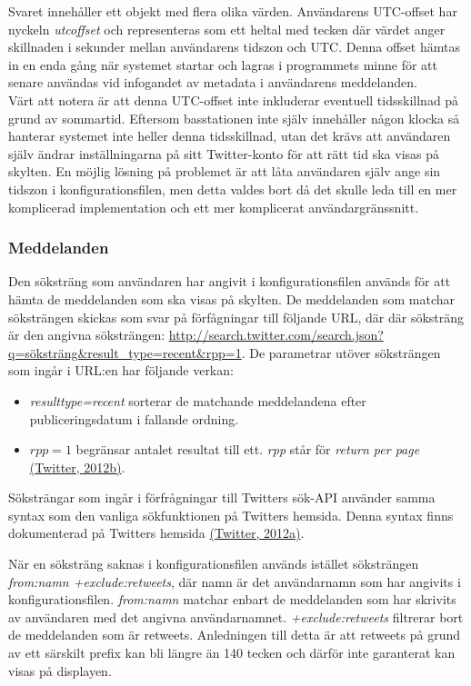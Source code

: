 \documentclass[a4paper,11pt]{article}
\begin{document}
Svaret innehåller ett objekt med flera olika värden. Användarens UTC-offset har nyckeln {\it utc\textunderscore offset} och representeras som ett heltal med tecken där värdet anger skillnaden i sekunder mellan användarens tidszon och UTC. Denna offset hämtas in en enda gång när systemet startar och lagras i programmets minne för att senare användas vid infogandet av metadata i användarens meddelanden.\\

Värt att notera är att denna UTC-offset inte inkluderar eventuell tidsskillnad på grund av sommartid. Eftersom basstationen inte själv innehåller någon klocka så hanterar systemet inte heller denna tidsskillnad, utan det krävs att användaren själv ändrar inställningarna på sitt Twitter-konto för att rätt tid ska visas på skylten. En möjlig lösning på problemet är att låta användaren själv ange sin tidszon i konfigurationsfilen, men detta valdes bort då det skulle leda till en mer komplicerad implementation och ett mer komplicerat användargränssnitt.

\subsubsection{Meddelanden}
Den söksträng som användaren har angivit i konfigurationsfilen används för att hämta de meddelanden som ska visas på skylten. De meddelanden som matchar söksträngen skickas som svar på förfågningar till följande URL, där där söksträng är den angivna söksträngen: \url{http://search.twitter.com/search.json?q=söksträng&result_type=recent&rpp=1}. De parametrar utöver söksträngen som ingår i URL:en har följande verkan:

	\begin{itemize}
    	\item {\it result\textunderscore type=recent} sorterar de matchande meddelandena efter publiceringsdatum i fallande ordning.
    	\item {\it $rpp=1$} begränsar antalet resultat till ett. {\it rpp} står för {\it return per page} \hyperref[twitter]{(Twitter, 2012b)}.
	\end{itemize}

Söksträngar som ingår i förfrågningar till Twitters sök-API använder samma syntax som den vanliga sökfunktionen på Twitters hemsida. Denna syntax finns dokumenterad på Twitters hemsida \hyperref[twitter]{(Twitter, 2012a)}.

När en söksträng saknas i konfigurationsfilen används istället söksträngen {\it from:namn +exclude:retweets}, där namn är det användarnamn som har angivits i konfigurationsfilen. {\it from:namn} matchar enbart de meddelanden som har skrivits av användaren med det angivna användarnamnet. {\it +exclude:retweets} filtrerar bort de meddelanden som är retweets. Anledningen till detta är att retweets på grund av ett särskilt prefix kan bli längre än 140 tecken och därför inte garanterat kan visas på displayen.
    	
\end{document}
